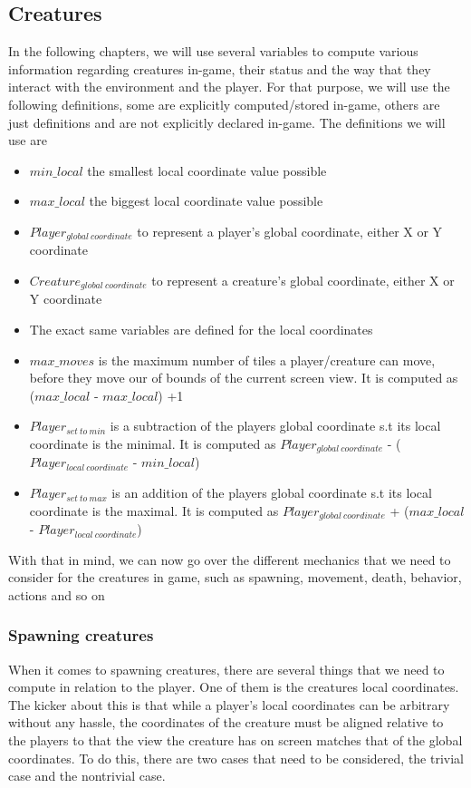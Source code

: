 \documentclass{report}
\begin{document}
\subsection*{Creatures}
In the following chapters, we will use several variables to compute various information regarding creatures in-game, their status and the way
that they interact with the environment and the player. For that purpose, we will use the following definitions, some are explicitly computed/stored in-game, others are just definitions and are not explicitly declared in-game. The definitions we will use are
\begin{itemize}
\item $min\_local$ the smallest local coordinate value possible 
\item $max\_local$ the biggest local coordinate value possible 
\item $Player_{global  \:coordinate}$  to represent a player's global coordinate, either X or Y coordinate 
\item $Creature_{global \: coordinate}$ to represent a creature's global coordinate, either X or Y coordinate 
\item The exact same variables are defined for the local coordinates 
\item $max\_moves$ is the maximum number of tiles a player/creature can move, before they move our of bounds of the current screen view. It is computed as  ($max\_local$ - $max\_local$) +1 
\item $Player_{set \: to \: min}$  is a subtraction of the players global coordinate s.t its local coordinate is the minimal. It is computed as  $Player_{global \: coordinate}$ - ($Player_{local \: coordinate}$ - $min\_local$)
\item $Player_{set \: to \: max}$  is an addition of the players global coordinate s.t its local coordinate is the maximal. It is computed as  $Player_{global \: coordinate}$ + ($max\_local$ - $Player_{local \: coordinate}$)
\end{itemize}
With that in mind, we can now go over the different mechanics that we need to consider for the creatures in game, such as spawning, movement, death, behavior, actions and so on

\subsubsection{Spawning creatures}
When it comes to spawning creatures, there are several things that we need to compute in relation to the player. One of them is the creatures local coordinates. The kicker about this is that while a player's local coordinates can be arbitrary without any hassle, the coordinates of the creature must be aligned relative to the players to that the view the creature has on screen matches that of the global coordinates. To do this, there are two cases that need to be considered, the trivial case and the nontrivial case. \newline
\end{document}
